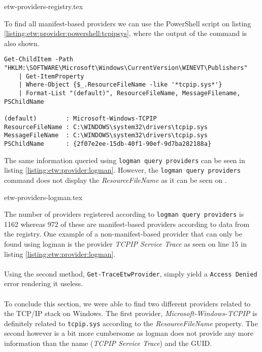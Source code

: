 \documentclass{report}
\begin{document}
{etw-providers-registry.tex}

To find all manifest-based providers we can use the PowerShell script on listing \ref{listing:etw:provider:powershell:tcpipsys}, where the output of the command is also shown.

\begin{listing}[H]
\begin{verbatim}
Get-ChildItem -Path "HKLM:\SOFTWARE\Microsoft\Windows\CurrentVersion\WINEVT\Publishers"
    | Get-ItemProperty
    | Where-Object {$_.ResourceFileName -like '*tcpip.sys*'}
    | Format-List "(default)", ResourceFileName, MessageFilename, PSChildName

(default)        : Microsoft-Windows-TCPIP
ResourceFileName : C:\WINDOWS\system32\drivers\tcpip.sys
MessageFileName  : C:\WINDOWS\system32\drivers\tcpip.sys
PSChildName      : {2f07e2ee-15db-40f1-90ef-9d7ba282188a}
\end{verbatim}
\caption{\texttt{logman query providers} output. See appendix \ref{appendix:etw-providers} for full output}
\label{listing:etw:provider:powershell:tcpipsys}
\end{listing}

The same information queried using \texttt{logman query providers} can be seen in listing \ref{listing:etw:provider:logman}. However, the \texttt{logman query providers} command does not display the \emph{ResourceFileName} as it can be seen on .

{etw-providers-logman.tex}

The number of providers registered according to \texttt{logman query providers} is 1162 whereas 972 of these are manifest-based providers according to data from the registry. One example of a non-manifest-based provider that can only be found using logman is the provider \emph{TCPIP Service Trace} as seen on line 15 in listing \ref{listing:etw:provider:logman}.
\\
\\
Using the second method, \texttt{Get-TraceEtwProvider}, simply yield a \texttt{Access Denied} error rendering it useless.
\\
\\
To conclude this section, we were able to find two different providers related to the TCP/IP stack on Windows. The first provider, \emph{Microsoft-Windows-TCPIP} is definitely related to \texttt{tcpip.sys} according to the \emph{ResourceFileName} property. The second however is a bit more cumbersome as logman does not provide any more information than the name (\emph{TCPIP Service Trace}) and the GUID.
\end{document}
